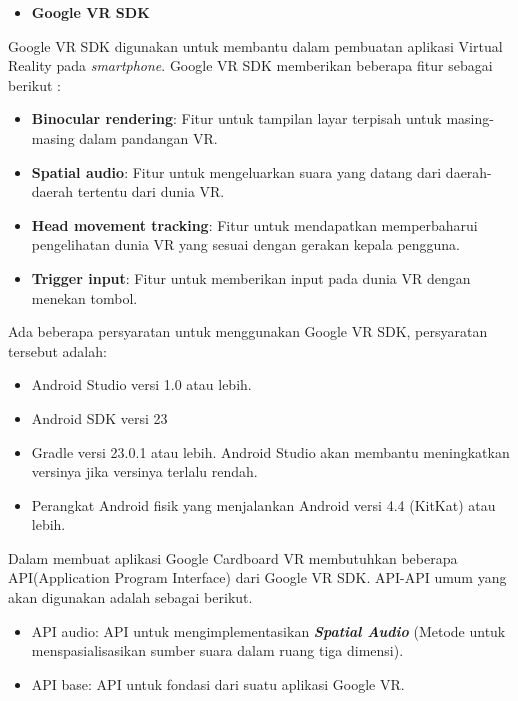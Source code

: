 \documentclass[a4paper,twoside]{article}
\begin{document}
\begin{enumerate}
\begin{itemize}
\end{itemize}
\begin{itemize}
	\item \textbf{Google VR SDK}
\end{itemize}

\label{sec:google_vr_sdk}
Google VR SDK\cite{google_vr_developers} digunakan untuk membantu dalam pembuatan aplikasi Virtual Reality pada \textit{smartphone}. Google VR SDK memberikan beberapa fitur sebagai berikut :
\begin{itemize}
	\item \textbf{Binocular rendering}: Fitur untuk tampilan layar terpisah untuk masing-masing dalam pandangan VR.
	\item \textbf{Spatial audio}: Fitur untuk mengeluarkan suara yang datang dari daerah-daerah tertentu dari dunia VR.
	\item \textbf{Head movement tracking}: Fitur untuk mendapatkan memperbaharui pengelihatan dunia VR yang sesuai dengan gerakan kepala pengguna.
	\item \textbf{Trigger input}: Fitur untuk memberikan input pada dunia VR dengan menekan tombol.
\end{itemize}

Ada beberapa persyaratan untuk menggunakan Google VR SDK, persyaratan tersebut adalah:
\begin{itemize}
	\item Android Studio versi 1.0 atau lebih.
	\item Android SDK versi 23
	\item Gradle versi 23.0.1 atau lebih. Android Studio akan membantu meningkatkan versinya jika versinya terlalu rendah.
	\item Perangkat Android fisik yang menjalankan Android versi 4.4 (KitKat) atau lebih.
\end{itemize}

Dalam membuat aplikasi Google Cardboard VR membutuhkan beberapa API(Application Program Interface) dari Google VR SDK. API-API umum yang akan digunakan adalah sebagai berikut. 
\begin{itemize}
	\item API audio: API untuk mengimplementasikan \textbf{\textit{Spatial Audio}} (Metode untuk menspasialisasikan sumber suara dalam ruang tiga dimensi).
	\item API base: API untuk fondasi dari suatu aplikasi Google VR.
\end{itemize}


\end{enumerate}
\end{document}
